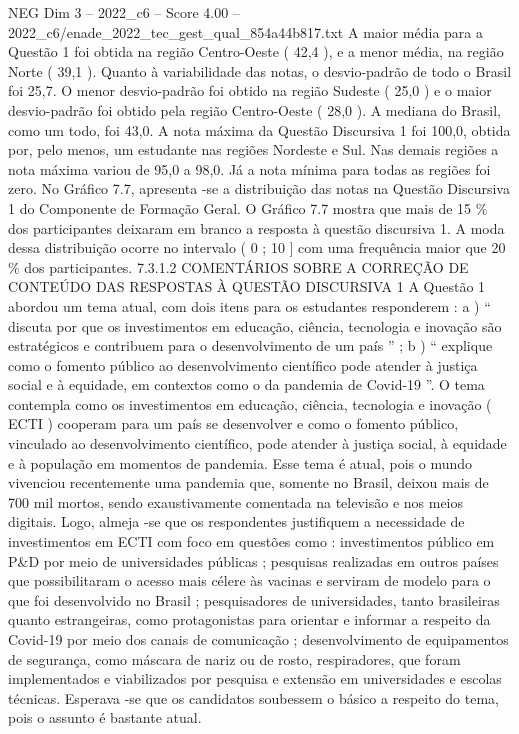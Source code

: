 \begin{textsample}{NEG Dim 3 – 2022\_c6 – Score 4.00 – 2022\_c6/enade\_2022\_tec\_gest\_qual\_854a44b817.txt}
A maior média para a Questão 1 foi obtida na região Centro-Oeste ( 42,4 ), e a menor média, na região Norte ( 39,1 ).
Quanto à variabilidade das notas, o desvio-padrão de todo o Brasil foi 25,7.
O menor desvio-padrão foi obtido na região Sudeste ( 25,0 ) e o maior desvio-padrão foi obtido pela região Centro-Oeste ( 28,0 ).
A mediana do Brasil, como um todo, foi 43,0.
A nota máxima da Questão Discursiva 1 foi 100,0, obtida por, pelo menos, um estudante nas regiões Nordeste e Sul.
Nas demais regiões a nota máxima variou de 95,0 a 98,0.
Já a nota mínima para todas as regiões foi zero.
No Gráfico 7.7, apresenta -se a distribuição das notas na Questão Discursiva 1 do Componente de Formação Geral.
O Gráfico 7.7 mostra que mais de 15 \% dos participantes deixaram em branco a resposta à questão discursiva 1.
A moda dessa distribuição ocorre no intervalo ( 0 ; 10 ] com uma frequência maior que 20 \% dos participantes. 7.3.1.2 COMENTÁRIOS SOBRE A CORREÇÃO DE CONTEÚDO DAS RESPOSTAS À QUESTÃO DISCURSIVA 1 A Questão 1 abordou um tema atual, com dois itens para os estudantes responderem : a ) “ discuta por que os investimentos em educação, ciência, tecnologia e inovação são estratégicos e contribuem para o desenvolvimento de um país ” ; b ) “ explique como o fomento público ao desenvolvimento científico pode atender à justiça social e à equidade, em contextos como o da pandemia de Covid-19 ”.
O tema contempla como os investimentos em educação, ciência, tecnologia e inovação ( ECTI ) cooperam para um país se desenvolver e como o fomento público, vinculado ao desenvolvimento científico, pode atender à justiça social, à equidade e à população em momentos de pandemia.
Esse tema é atual, pois o mundo vivenciou recentemente uma pandemia que, somente no Brasil, deixou mais de 700 mil mortos, sendo exaustivamente comentada na televisão e nos meios digitais.
Logo, almeja -se que os respondentes justifiquem a necessidade de investimentos em ECTI com foco em questões como : investimentos público em P\&D por meio de universidades públicas ; pesquisas realizadas em outros países que possibilitaram o acesso mais célere às vacinas e serviram de modelo para o que foi desenvolvido no Brasil ; pesquisadores de universidades, tanto brasileiras quanto estrangeiras, como protagonistas para orientar e informar a respeito da Covid-19 por meio dos canais de comunicação ; desenvolvimento de equipamentos de segurança, como máscara de nariz ou de rosto, respiradores, que foram implementados e viabilizados por pesquisa e extensão em universidades e escolas técnicas.
Esperava -se que os candidatos soubessem o básico a respeito do tema, pois o assunto é bastante atual.

\end{textsample}
